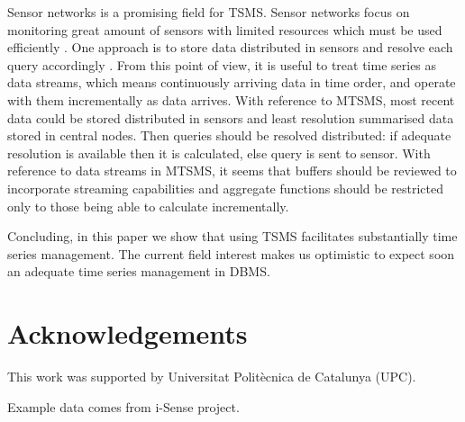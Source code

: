 Sensor networks is a promising field for TSMS. Sensor networks focus
on monitoring great amount of sensors with limited resources which
must be used efficiently \cite{yaogehrke02}. One approach is to store
data distributed in sensors and resolve each query accordingly
\cite{bonnet01}. From this point of view, it is useful to treat time
series as data streams, which means continuously arriving data in time
order, and operate with them incrementally as data arrives.  With
reference to MTSMS, most recent data could be stored distributed in
sensors and least resolution summarised data stored in central
nodes. Then queries should be resolved distributed: if adequate
resolution is available then it is calculated, else query is sent to
sensor.  With reference to data streams in MTSMS, it seems that
buffers should be reviewed to incorporate streaming capabilities and
aggregate functions should be restricted only to those being able
to calculate incrementally.


Concluding, in this paper we show that using TSMS facilitates
substantially time series management. The current field interest makes
us optimistic to expect soon an adequate time series management in
DBMS.


\section*{Acknowledgements}

This work was supported by Universitat Polit\`{e}cnica de Catalunya (UPC).

Example data comes from i-Sense project.







